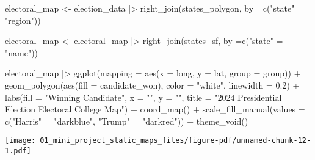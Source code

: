 \documentclass[
  letterpaper,
  DIV=11,
  numbers=noendperiod]{scrartcl}
\newenvironment{Shaded}{\begin{snugshade}}{\end{snugshade}}
\newcommand{\AttributeTok}[1]{\textcolor[rgb]{0.40,0.45,0.13}{#1}}
\newcommand{\FloatTok}[1]{\textcolor[rgb]{0.68,0.00,0.00}{#1}}
\newcommand{\FunctionTok}[1]{\textcolor[rgb]{0.28,0.35,0.67}{#1}}
\newcommand{\NormalTok}[1]{\textcolor[rgb]{0.00,0.23,0.31}{#1}}
\newcommand{\OtherTok}[1]{\textcolor[rgb]{0.00,0.23,0.31}{#1}}
\newcommand{\SpecialCharTok}[1]{\textcolor[rgb]{0.37,0.37,0.37}{#1}}
\newcommand{\StringTok}[1]{\textcolor[rgb]{0.13,0.47,0.30}{#1}}
\begin{document}
\begin{Shaded}
\begin{Highlighting}[]
\NormalTok{electoral\_map }\OtherTok{\textless{}{-}}\NormalTok{ election\_data }\SpecialCharTok{|\textgreater{}}
  \FunctionTok{right\_join}\NormalTok{(states\_polygon, }\AttributeTok{by =}\FunctionTok{c}\NormalTok{(}\StringTok{"state"} \OtherTok{=} \StringTok{"region"}\NormalTok{))}

\NormalTok{electoral\_map }\OtherTok{\textless{}{-}}\NormalTok{ electoral\_map }\SpecialCharTok{|\textgreater{}}
  \FunctionTok{right\_join}\NormalTok{(states\_sf, }\AttributeTok{by =}\FunctionTok{c}\NormalTok{(}\StringTok{"state"} \OtherTok{=} \StringTok{"name"}\NormalTok{))}
\end{Highlighting}
\end{Shaded}

\begin{Shaded}
\begin{Highlighting}[]
\NormalTok{electoral\_map }\SpecialCharTok{|\textgreater{}}
  \FunctionTok{ggplot}\NormalTok{(}\AttributeTok{mapping =} \FunctionTok{aes}\NormalTok{(}\AttributeTok{x =}\NormalTok{ long, }\AttributeTok{y =}\NormalTok{ lat,}
                       \AttributeTok{group =}\NormalTok{ group)) }\SpecialCharTok{+}
  \FunctionTok{geom\_polygon}\NormalTok{(}\FunctionTok{aes}\NormalTok{(}\AttributeTok{fill =}\NormalTok{ candidate\_won), }\AttributeTok{color =} \StringTok{"white"}\NormalTok{, }\AttributeTok{linewidth =} \FloatTok{0.2}\NormalTok{) }\SpecialCharTok{+}
  \FunctionTok{labs}\NormalTok{(}\AttributeTok{fill =} \StringTok{"Winning Candidate"}\NormalTok{,}
       \AttributeTok{x =} \StringTok{""}\NormalTok{,}
       \AttributeTok{y =} \StringTok{""}\NormalTok{,}
       \AttributeTok{title =} \StringTok{"2024 Presidential Election Electoral College Map"}\NormalTok{) }\SpecialCharTok{+}
  \FunctionTok{coord\_map}\NormalTok{() }\SpecialCharTok{+}
  \FunctionTok{scale\_fill\_manual}\NormalTok{(}\AttributeTok{values =} \FunctionTok{c}\NormalTok{(}\StringTok{"Harris"} \OtherTok{=} \StringTok{"darkblue"}\NormalTok{, }\StringTok{"Trump"} \OtherTok{=} \StringTok{"darkred"}\NormalTok{)) }\SpecialCharTok{+}
  \FunctionTok{theme\_void}\NormalTok{()}
\end{Highlighting}
\end{Shaded}

\texttt{[image: 01\_mini\_project\_static\_maps\_files/figure-pdf/unnamed-chunk-12-1.pdf]}
\end{document}
